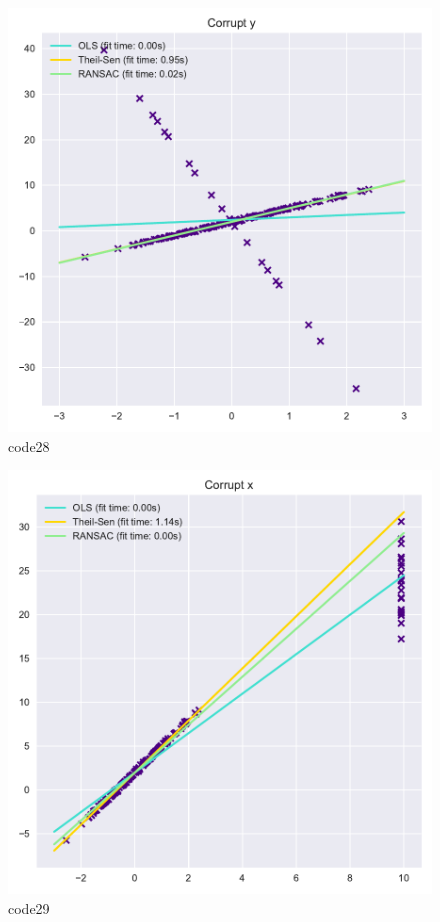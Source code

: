 \begin{figure}[htbp]
	\centering
	\includegraphics[width=14cm]{codeimage/code28}
	\caption{code28}
	\label{code28}
\end{figure}

\begin{figure}[htbp]
	\centering
	\includegraphics[width=14cm]{codeimage/code29}
	\caption{code29}
	\label{code29}
\end{figure}


